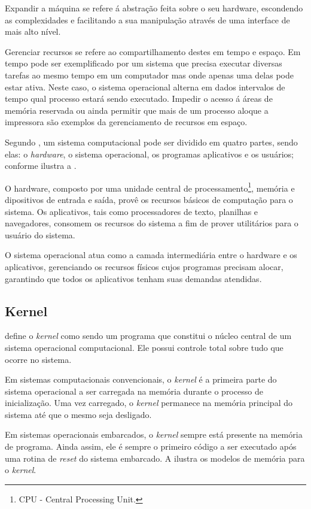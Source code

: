 Expandir a máquina se refere á abstração feita sobre o seu hardware, escondendo as complexidades e facilitando a sua manipulação através de uma interface de mais alto nível. 

Gerenciar recursos se refere ao compartilhamento destes em tempo e espaço. Em tempo pode ser exemplificado por um sistema que precisa executar diversas tarefas ao mesmo tempo em um computador mas onde apenas uma delas pode estar ativa. Neste caso, o sistema operacional alterna em dados intervalos de tempo qual processo estará sendo executado. Impedir o acesso á áreas de memória reservada ou ainda permitir que mais de um processo aloque a impressora são exemplos da gerenciamento de recursos em espaço.

Segundo , um sistema computacional pode ser dividido em quatro partes, sendo elas: o \emph{hardware}, o sistema operacional, os programas aplicativos e os usuários; conforme ilustra a .


O hardware, composto por uma unidade central de processamento\footnote{CPU - Central Processing Unit.}, memória e dipositivos de entrada e saída, provê os recursos básicos de computação para o sistema. Os aplicativos, tais como processadores de texto, planilhas e navegadores, consomem os recursos do sistema a fim de prover utilitários para o usuário do sistema.

O sistema operacional atua como a camada intermediária entre o hardware e os aplicativos, gerenciando os recursos físicos cujos programas precisam alocar, garantindo que todos os aplicativos tenham suas demandas atendidas.

\subsection{Kernel}

\cite{linfo} define o \emph{kernel} como sendo um programa que constitui o núcleo central de um sistema operacional computacional. Ele possui controle total sobre tudo que ocorre no sistema.

Em sistemas computacionais convencionais, o \emph{kernel} é a primeira parte do sistema operacional a ser carregada na memória durante o processo de inicialização. Uma vez carregado, o \emph{kernel} permanece na memória principal do sistema até que o mesmo seja desligado.

Em sistemas operacionais embarcados, o \emph{kernel} sempre está presente na memória de programa. Ainda assim, ele é sempre o primeiro código a ser executado após uma rotina de \emph{reset} do sistema embarcado. A  ilustra os modelos de memória para o \emph{kernel}.

